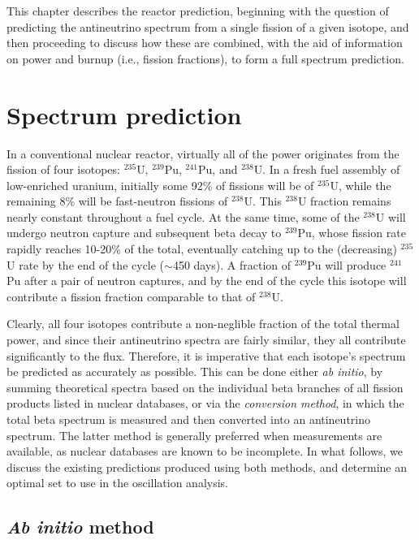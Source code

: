 \documentclass[../thesis.tex]{subfiles}
\begin{document}
This chapter describes the reactor prediction, beginning with the question of predicting the antineutrino spectrum from a single fission of a given isotope, and then proceeding to discuss how these are combined, with the aid of information on power and burnup (i.e., fission fractions), to form a full spectrum prediction.

\section{Spectrum prediction}
\label{sec:specpred}

\def\urfive{$^{235}$U\xspace} \def\punine{$^{239}$Pu\xspace}
\def\puone{$^{241}$Pu\xspace} \def\ureight{$^{238}$U\xspace}

In a conventional nuclear reactor, virtually all of the power originates from the fission of four isotopes: \urfive, \punine, \puone, and \ureight. In a fresh fuel assembly of low-enriched uranium, initially some 92\% of fissions will be of \urfive, while the remaining 8\% will be fast-neutron fissions of \ureight. This \ureight fraction remains nearly constant throughout a fuel cycle. At the same time, some of the \ureight will undergo neutron capture and subsequent beta decay to \punine, whose fission rate rapidly reaches 10-20\% of the total, eventually catching up to the (decreasing) \urfive rate by the end of the cycle ($\sim$450 days). A fraction of \punine will produce \puone after a pair of neutron captures, and by the end of the cycle this isotope will contribute a fission fraction comparable to that of \ureight.

Clearly, all four isotopes contribute a non-neglible fraction of the total thermal power, and since their antineutrino spectra are fairly similar, they all contribute significantly to the flux. Therefore, it is imperative that each isotope's spectrum be predicted as accurately as possible. This can be done either \emph{ab initio}, by summing theoretical spectra based on the individual beta branches of all fission products listed in nuclear databases, or via the \emph{conversion method}, in which the total beta spectrum is measured and then converted into an antineutrino spectrum. The latter method is generally preferred when measurements are available, as nuclear databases are known to be incomplete. In what follows, we discuss the existing predictions produced using both methods, and determine an optimal set to use in the oscillation analysis.

\subsection{\textit{Ab initio} method}
\label{sec:abinitio}
\end{document}
